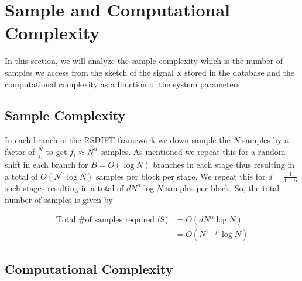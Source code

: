 \section{Sample and Computational Complexity}
\label{Sec:Complexity}
In this section, we will analyze the sample complexity which is the  number of samples we access from the sketch of the signal $\vec{\mathrm{x}}$ stored in the database and the computational complexity as a function of the system parameters.

\subsection{\bf Sample Complexity}
In each branch of the RSDIFT framework we down-sample the $N$ samples by a factor of $\frac{N}{f_i}$ to get $f_i\approx N^{\alpha}$ samples. As mentioned we repeat this for a random shift in each branch for $B=O(\log N)$ branches in each stage thus resulting in a total of $O(N^{\alpha}\log N)$ samples per block per stage. We repeat this for $d = \frac{1}{1-\alpha}$ such stages resulting in a total of $dN^{\alpha}\log N$ samples per block. So, the total number of samples is given by  

\begin{align*}
\text{Total \# of samples required (S)} &= O \left(dN^{\alpha}\log N\right)\\
   &=   O(N^{1-\mu}\log N)
\end{align*}




\subsection{\bf Computational Complexity}

